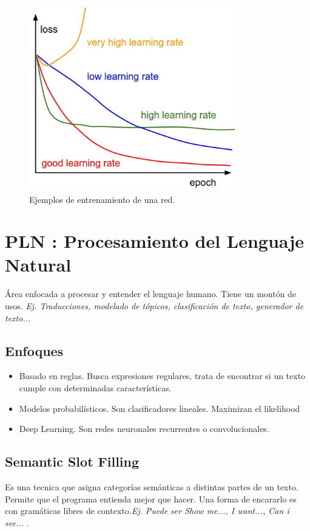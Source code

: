 \documentclass[titlepage,a4paper]{article}
\begin{document}
\begin{figure}[!htb]
    \centering
    \includegraphics[width=0.8\textwidth]{imagenesResumen/EjemplosEntrenamiento.jpeg}
    \caption{Ejemplos de entrenamiento de una red.}
\end{figure}


\newpage

\section{PLN : Procesamiento del Lenguaje Natural}
Área enfocada a procesar y entender el lenguaje humano. Tiene un montón de usos. \textit{Ej. Traducciones, modelado de tópicos, clasificación de texto, generador de texto...}

\subsection{Enfoques}

\begin{itemize}
    \item Basado en reglas. Busca expresiones regulares, trata de encontrar si un texto cumple con determinadas características.
    \item Modelos probabilísticos. Son clasificadores lineales. Maximizan el likelihood
    \item Deep Learning. Son redes neuronales recurrentes o convolucionales.
\end{itemize}

\subsection{Semantic Slot Filling}
Es una tecnica que asigna categorías semánticas a distintas partes de un texto. Permite que el programa entienda mejor que hacer. Una forma de encararlo es con gramáticas libres de contexto.\textit{Ej. Puede ser Show me..., I want..., Can i see... }.
\end{document}
